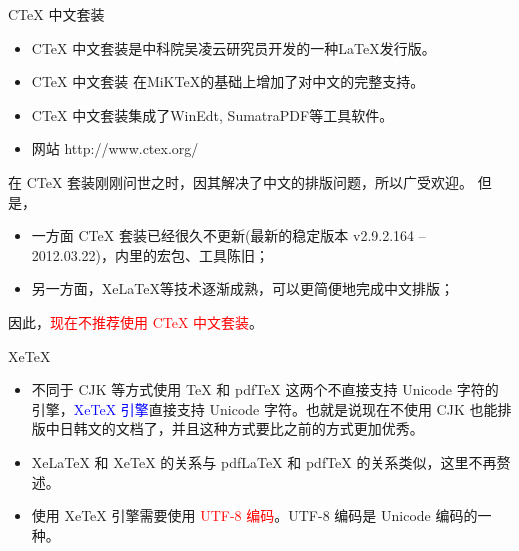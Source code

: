 \documentclass[13pt]{ctexbeamer}
\newcommand{\red}[1]{\textcolor{red}{#1}}
\newcommand{\blue}[1]{\textcolor{blue}{#1}}
\begin{document}
\begin{frame}{CTeX 中文套装}
	
	
	\begin{itemize}
		\item 
		CTeX 中文套装是中科院吴凌云研究员开发的一种LaTeX发行版。
		
		\item 
		CTeX 中文套装 在MiKTeX的基础上增加了对中文的完整支持。
		
		\item CTeX 中文套装集成了WinEdt, SumatraPDF等工具软件。
		\item 
		网站  http://www.ctex.org/
		

	\end{itemize}
	在 CTeX 套装刚刚问世之时，因其解决了中文的排版问题，所以广受欢迎。 但是，
	\begin{itemize}
		\item  一方面 CTeX 套装已经很久不更新(最新的稳定版本	v2.9.2.164 -- 2012.03.22)，内里的宏包、工具陈旧；
		\item 另一方面，XeLaTeX等技术逐渐成熟，可以更简便地完成中文排版；
	\end{itemize}
	
	因此，\red{现在不推荐使用 CTeX 中文套装}。
	
\end{frame}


\begin{frame}{XeTeX}
	
	\begin{itemize}
		\item 不同于 CJK 等方式使用 TeX 和 pdfTeX 这两个不直接支持 Unicode 字符的引擎，\blue{XeTeX 引擎}直接支持 Unicode 字符。也就是说现在不使用 CJK 也能排版中日韩文的文档了，并且这种方式要比之前的方式更加优秀。
		
		\item XeLaTeX 和 XeTeX 的关系与 pdfLaTeX 和 pdfTeX 的关系类似，这里不再赘述。
		
		\item  使用 XeTeX 引擎需要使用 \red{UTF-8 编码}。{UTF-8 编码}是 Unicode 编码的一种。
	\end{itemize}
\end{frame}
\end{document}
